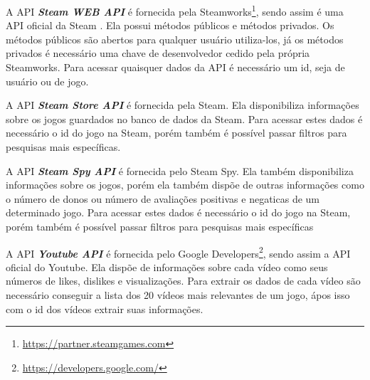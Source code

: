 A API \textit{\textbf{Steam WEB API}} é fornecida pela Steamworks\footnote[5]{\url{https://partner.steamgames.com}}, sendo assim é uma API oficial da Steam \cite{steam_api}. Ela possui métodos públicos e métodos privados. Os métodos públicos são abertos para qualquer usuário utiliza-los, já os métodos privados é necessário uma chave de desenvolvedor cedido pela própria Steamworks. Para acessar quaisquer dados da API é necessário um id, seja de usuário ou de jogo.

A API \textit{\textbf{Steam Store API}} é fornecida pela Steam. Ela disponibiliza informações sobre os jogos guardados no banco de dados da Steam. Para acessar estes dados é necessário o id do jogo na Steam, porém também é possível passar filtros para pesquisas mais específicas.

A API \textit{\textbf{Steam Spy API}} é fornecida pelo Steam Spy. Ela também disponibiliza informações sobre os jogos, porém ela também dispõe de outras informações como o número de donos ou número de avaliações positivas e negaticas de um determinado jogo. Para acessar estes dados é necessário o id do jogo na Steam, porém também é possível passar filtros para pesquisas mais específicas

A API \textit{\textbf{Youtube API}} é fornecida pelo Google Developers\footnote[6]{\url{https://developers.google.com/}}, sendo assim a API oficial do Youtube. Ela dispõe de informações sobre cada vídeo como seus números de likes, dislikes e visualizações. Para extrair os dados de cada vídeo são necessário conseguir a lista dos 20 vídeos mais relevantes de um jogo, ápos isso com o id dos vídeos extrair suas informações.

